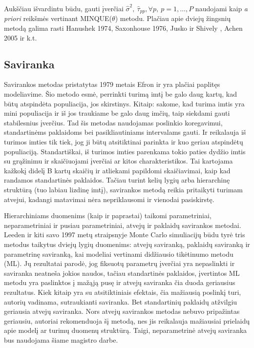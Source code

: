 \documentclass[12pt,a4paper]{article}
\begin{document}
\indent Aukščiau išvardintu būdu, gauti įverčiai $\hat{\sigma}^2,\ \hat{\tau}_{pp}, \forall p,\ p=1,\dots,P$ naudojami kaip \textit{a priori} reikšmės vertinant MINQUE($\theta$) metodu. Plačiau apie dviejų žingsnių metodą galima rasti Hanushek 1974\cite{hanushek}, Saxonhouse 1976\cite{saxonhouse}, Jusko ir Shively \cite{jusko},  Achen 2005\cite{achen} ir k.t.


\subsection{Saviranka}

\indent Savirankos metodas pristatytas 1979 metais Efron \cite{efron} ir yra plačiai paplitęs modeliavime. Šio metodo esmė, perrinkti turimą imtį be galo daug kartų, kad būtų atspindėta populiacija, jos skirstinys. Kitaip: sakome, kad turima imtis yra mini populiacija ir iš jos traukiame be galo daug imčių, taip siekdami gauti stabilesnius įverčius. Tad šis metodas naudojamas poslinkio koregavimui, standartinėms paklaidoms bei pasikliautiniams intervalams gauti. Ir reikalauja iš turimos imties tik tiek, jog ji būtų atsitiktinai parinkta ir kuo geriau atspindėtų populiaciją. Standartiškai, iš turimos imties parenkama tokio paties dydžio imtis su grąžinimu ir skaičiuojami įverčiai ar kitos charakteristikos. Tai kartojama kažkokį didelį B kartų skaičių ir atliekami papildomi skaičiavimai, kaip kad randamos standartinės paklaidos. Tačiau turint kelių lygių arba hierarchinę struktūrą (tuo labiau lizdinę imtį), savirankos metodą reikia pritaikyti turimam atvejui, kadangi matavimai nėra nepriklausomi ir vienodai pasiskirstę.

\indent Hierarchiniams duomenims (kaip ir paprastai) taikomi parametriniai, neparametriniai ir pusiau parametriniai, atvejų ir paklaidų savirankos metodai. Leeden ir kiti \cite{bootML} savo 1997 metų straipsnyje Monte Carlo simuliacijų būdu tyrė tris metodus taikytus dviejų lygių duomenims: atvejų saviranką, paklaidų saviranką ir parametrinę saviranką, kai modeliai vertinami didžiausio tikėtinumo metodu (ML). Jų rezultatai parodė, jog fiksuotų parametrų įverčiai yra nepaslinkti ir saviranka neatneša jokios naudos, tačiau standartinės paklaidos, įvertintos ML metodu yra paslinktos į mažąją pusę ir atvejų saviranka čia duoda geriausius rezultatus. Kiek kitaip yra su atsitiktiniais efektais, čia mažiausią poslinkį turi, autorių vadinama, sutraukianti saviranka. Bet standartinių paklaidų atžvilgiu geriausia atvejų saviranka. Nors atvejų savirankos metodas nebuvo pripažintas geriausiu, autoriai rekomenduoja šį metodą, nes jis reikalauja mažiausiai prielaidų apie modelį ar turimų duomenų struktūrą. Taigi, neparametrinė atvejų saviranka bus naudojama šiame magistro darbe.
\end{document}
